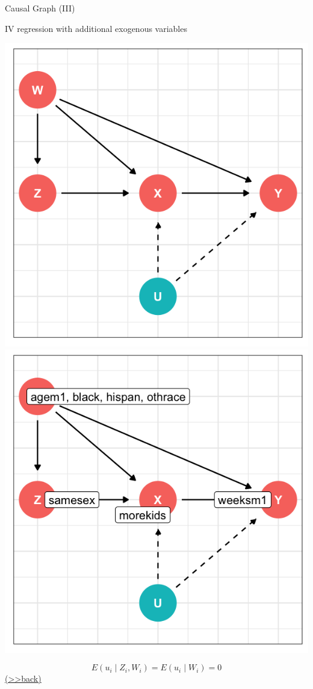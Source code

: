 \documentclass[
  10pt,
  ignorenonframetext,
]{beamer}
\begin{document}
\begin{frame}{Causal Graph (III)}
\protect\hypertarget{IVCCG}{}
\begin{block}{IV regression with additional exogenous variables}
\protect\hypertarget{iv-regression-with-additional-exogenous-variables-1}{}
\begin{center}\includegraphics[width=0.48\linewidth,height=0.58\textheight]{pictures/IVCsetting1} \includegraphics[width=0.48\linewidth,height=0.58\textheight]{pictures/IVCsetting2} \end{center}

\[
E(u_i \mid Z_i, W_i) = E(u_i \mid W_i) = 0
\]
\footnotesize\protect\hyperlink{IVCQ}{(\textgreater\textgreater back)}
\normalsize
\end{block}
\end{frame}
\end{document}
